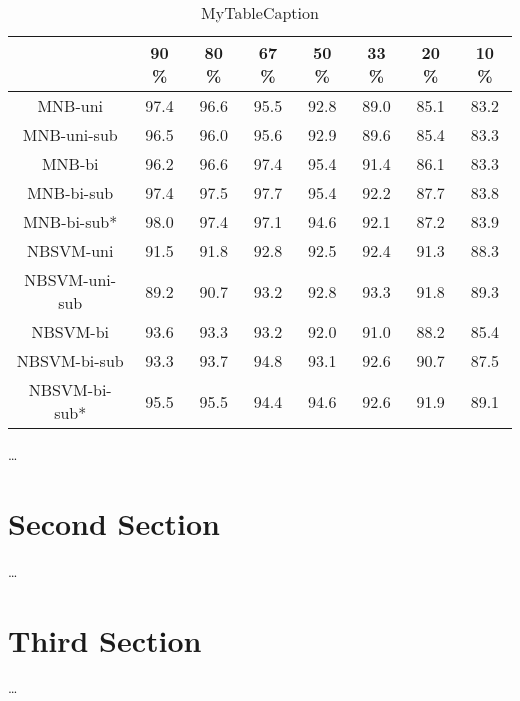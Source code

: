 \begin{table}                                                    
\centering                                                       
\begin{tabular}{|c|c|c|c|c|c|c|c|}                               
\hline                                                           
 & 90 \% & 80 \% & 67 \% & 50 \% & 33 \% & 20 \% & 10 \% \\      
\hline                                                           
MNB-uni & 97.4 & 96.6 & 95.5 & 92.8 & 89.0 & 85.1 & 83.2 \\      
\hline                                                           
MNB-uni-sub & 96.5 & 96.0 & 95.6 & 92.9 & 89.6 & 85.4 & 83.3 \\  
\hline                                                           
MNB-bi & 96.2 & 96.6 & 97.4 & 95.4 & 91.4 & 86.1 & 83.3 \\       
\hline                                                           
MNB-bi-sub & 97.4 & 97.5 & 97.7 & 95.4 & 92.2 & 87.7 & 83.8 \\   
\hline                                                           
MNB-bi-sub* & 98.0 & 97.4 & 97.1 & 94.6 & 92.1 & 87.2 & 83.9 \\  
\hline                                                           
NBSVM-uni & 91.5 & 91.8 & 92.8 & 92.5 & 92.4 & 91.3 & 88.3 \\    
\hline                                                           
NBSVM-uni-sub & 89.2 & 90.7 & 93.2 & 92.8 & 93.3 & 91.8 & 89.3 \\
\hline                                                           
NBSVM-bi & 93.6 & 93.3 & 93.2 & 92.0 & 91.0 & 88.2 & 85.4 \\     
\hline                                                           
NBSVM-bi-sub & 93.3 & 93.7 & 94.8 & 93.1 & 92.6 & 90.7 & 87.5 \\ 
\hline                                                           
NBSVM-bi-sub* & 95.5 & 95.5 & 94.4 & 94.6 & 92.6 & 91.9 & 89.1 \\
\hline                                                           
\end{tabular}                                                    
\caption{MyTableCaption}                                         
\label{table:MyTableLabel}                                       
\end{table}
\dots

\section{Second Section}
\label{sec:Evaluation:SecondSection}

\dots

\section{Third Section}
\label{sec:Evaluation:ThirdSection}

\dots
